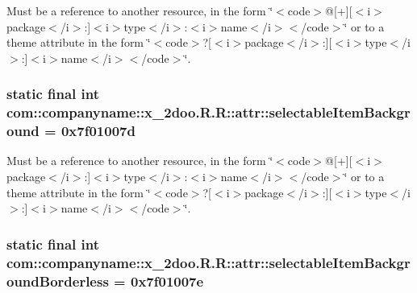 Must be a reference to another resource, in the form \char`\"{}$<$code$>$@\mbox{[}+\mbox{]}\mbox{[}$<$i$>$package$<$/i$>$:\mbox{]}$<$i$>$type$<$/i$>$:$<$i$>$name$<$/i$>$$<$/code$>$\char`\"{} or to a theme attribute in the form \char`\"{}$<$code$>$?\mbox{[}$<$i$>$package$<$/i$>$:\mbox{]}\mbox{[}$<$i$>$type$<$/i$>$:\mbox{]}$<$i$>$name$<$/i$>$$<$/code$>$\char`\"{}. \hypertarget{classcom_1_1companyname_1_1x__2doo_1_1_r_1_1attr_f3fe2239b6e4cd57138b9d64e849ae62}{
\subsubsection[{selectableItemBackground}]{\setlength{\rightskip}{0pt plus 5cm}static final int com::companyname::x\_\-2doo.R.R::attr::selectableItemBackground = 0x7f01007d}}
\label{classcom_1_1companyname_1_1x__2doo_1_1_r_1_1attr_f3fe2239b6e4cd57138b9d64e849ae62}


Must be a reference to another resource, in the form \char`\"{}$<$code$>$@\mbox{[}+\mbox{]}\mbox{[}$<$i$>$package$<$/i$>$:\mbox{]}$<$i$>$type$<$/i$>$:$<$i$>$name$<$/i$>$$<$/code$>$\char`\"{} or to a theme attribute in the form \char`\"{}$<$code$>$?\mbox{[}$<$i$>$package$<$/i$>$:\mbox{]}\mbox{[}$<$i$>$type$<$/i$>$:\mbox{]}$<$i$>$name$<$/i$>$$<$/code$>$\char`\"{}. \hypertarget{classcom_1_1companyname_1_1x__2doo_1_1_r_1_1attr_5cb1f552a165d6b177d3dfdf94f98487}{
\subsubsection[{selectableItemBackgroundBorderless}]{\setlength{\rightskip}{0pt plus 5cm}static final int com::companyname::x\_\-2doo.R.R::attr::selectableItemBackgroundBorderless = 0x7f01007e}}
\label{classcom_1_1companyname_1_1x__2doo_1_1_r_1_1attr_5cb1f552a165d6b177d3dfdf94f98487}


